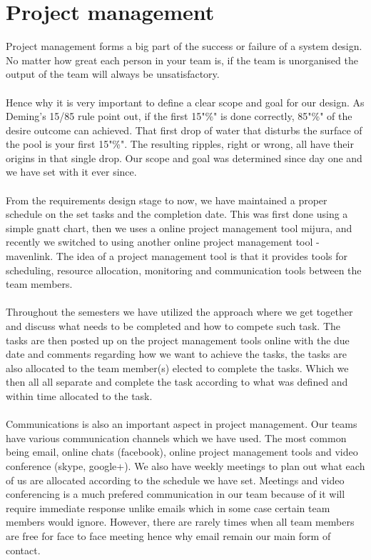 \documentclass[a4paper]{article}
\begin{document}
\section{Project management}
Project management forms a big part of the success or failure of a system design. No matter how great each person in your team is, if the team is unorganised the output of the team will always be unsatisfactory.
\\\\
Hence why it is very important to define a clear scope and goal for our design. As Deming’s 15/85 rule point out, if the first 15"\%" is done correctly, 85"\%" of the desire outcome can achieved. That first drop of water that disturbs the surface of the pool is your first 15"\%". The resulting ripples, right or wrong, all have their origins in that single drop. Our scope and goal was determined since day one and we have set with it ever since.
\\\\
From the requirements design stage to now, we have maintained a proper schedule on the set tasks and the completion date. This was first done using a simple gnatt chart, then we uses a online project management tool mijura, and recently we switched to using another online project management tool - mavenlink. The idea of a project management tool is that it provides tools for scheduling, resource allocation, monitoring and  communication tools between the team members. 
\\\\
Throughout the semesters we have utilized the approach where we get together and discuss what needs to be completed and how to compete such task. The tasks are then posted up on the project management tools online with the due date and comments regarding how we want to achieve the tasks, the tasks are also allocated to the team member(s) elected to complete the tasks. Which we then all all separate and complete the task according to what was defined and within  time allocated to the task. 
\\\\
Communications is also an important aspect in project management. Our teams have various communication channels which we have used. The most common being email, online chats (facebook), online project management tools and video conference (skype, google+). We also have weekly meetings to plan out what each of us are allocated according to the schedule we have set. Meetings and video conferencing is a much prefered communication in our team because of it will require immediate response unlike emails which in some case certain team members would ignore. However, there are rarely times when all team members are free for face to face meeting hence why email remain our main form of contact.
\end{document}

